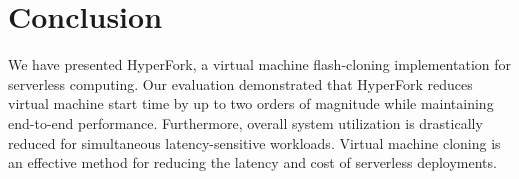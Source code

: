 \section{Conclusion}

We have presented HyperFork, a virtual machine flash-cloning implementation for
serverless computing. Our evaluation demonstrated that HyperFork reduces
virtual machine start time by up to two orders of magnitude while maintaining
end-to-end performance. Furthermore, overall system utilization is drastically
reduced for simultaneous latency-sensitive workloads. Virtual machine cloning
is an effective method for reducing the latency and cost of serverless
deployments.
